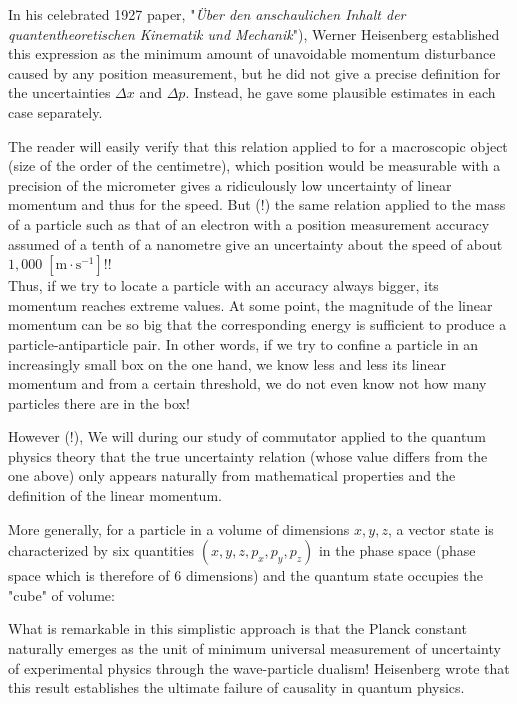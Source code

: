 	In his celebrated 1927 paper, "\textit{Über den anschaulichen Inhalt der quantentheoretischen Kinematik und Mechanik}"), Werner Heisenberg established this expression as the minimum amount of unavoidable momentum disturbance caused by any position measurement, but he did not give a precise definition for the uncertainties $\Delta x$ and $\Delta p$. Instead, he gave some plausible estimates in each case separately.
	\begin{tcolorbox}[title=Remark,colframe=black,arc=10pt]
	The reader will easily verify that this relation applied to for a macroscopic object (size of the order of the centimetre), which position would be measurable with a precision of the micrometer gives a ridiculously low uncertainty of linear momentum and thus for the speed. But (!) the same relation applied to the mass of a particle such as that of an electron with a position measurement accuracy assumed of a tenth of a nanometre give an uncertainty about the speed of about $1,000\;[\text{m}\cdot\text{s}^{-1}]$!!\\

	Thus, if we try to locate a particle with an accuracy always bigger, its momentum reaches extreme values. At some point, the magnitude of the linear momentum can be so big that the corresponding energy is sufficient to produce a particle-antiparticle pair. In other words, if we try to confine a particle in an increasingly small box on the one hand, we know less and less its linear momentum and from a certain threshold, we do not even know not how many particles there are in the box!
	\end{tcolorbox}
	However (!), We will during our study of commutator applied to the quantum physics theory that the true uncertainty relation (whose value differs from the one above) only appears naturally from mathematical properties and the definition of the linear momentum.

	More generally, for a particle in a volume  of dimensions $x, y, z$, a vector state is characterized by six quantities $(x,y,z,p_x,p_y,p_z)$ in the phase space (phase space which is therefore of $6$ dimensions) and the quantum state occupies the "cube" of volume:
	
	What is remarkable in this simplistic approach is that the Planck constant naturally emerges as the unit of minimum universal measurement of uncertainty of experimental physics through the wave-particle dualism! Heisenberg wrote that this result establishes the ultimate failure of causality in quantum physics.
	
